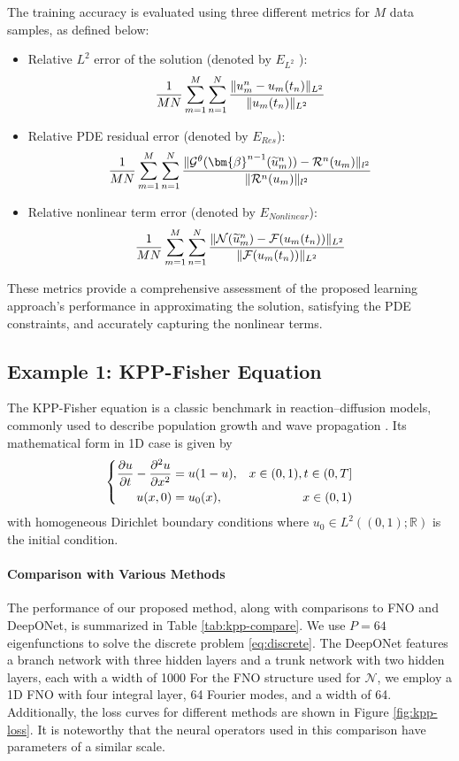 \documentclass[preprint,12pt]{elsarticle}
\theoremstyle{plain}
\numberwithin{figure}{section}
\numberwithin{table}{section}
\begin{document}
The training accuracy is evaluated using three different metrics for $M$ data samples, as defined below:
\begin{itemize}
	\item Relative $L^2$  error of the solution (denoted by $E_{L^2}$ ): 
	$${1\over MN}\sum_{m=1}^M\sum_{n=1}^{N} {\|{u}^n_m-u_m(t_n)\|_{L^2}\over \|u_m(t_n)\|_{L^2}}$$
	\item Relative PDE residual error (denoted by $E_{Res}$):
	$${1\over MN}\sum_{m=1}^M\sum_{n=1}^{N} {\|\mathcal{G}^\theta(\bm{{\beta}}^{n-1}(\widetilde{u}^n_m))-\mathcal{R}^n(u_m)\|_{l^2}\over \|\mathcal{R}^n(u_m)\|_{l^2}}$$
	\item Relative nonlinear term error (denoted by $E_{Nonlinear}$):
	$${1\over MN}\sum_{m=1}^M\sum_{n=1}^{N} {\|\mathcal{N}(\widetilde{u}^n_m)-\mathcal{F}(u_m(t_n))\|_{L^2}\over \|\mathcal{F}(u_m(t_n))\|_{L^2}}$$
\end{itemize}

These metrics provide a comprehensive assessment of the proposed learning approach’s performance in approximating the solution, satisfying the PDE constraints, and accurately capturing the nonlinear terms.
\subsection{Example 1: KPP-Fisher  Equation}\label{subsec:kpp}
The KPP-Fisher equation is a classic benchmark in reaction--diffusion models, commonly used to describe population growth and wave propagation \cite{holmes1994partial,fisher1937wave}. Its mathematical form in 1D case is given by\begin{equation}
	\left\{	\begin{aligned}
		{\partial u\over \partial t}-{\partial^2 u\over \partial x^2}  &= u(1 -u),  &x\in (0,1),t\in (0,T]\\
		u(x,0) &= u_0(x), &x\in (0,1)
	\end{aligned}\right.
\end{equation}
with homogeneous Dirichlet boundary conditions where $u_0 \in L^2((0,1);\mathbb{R})$ is the initial condition. 

\paragraph{Comparison with  Various Methods}

The performance of our proposed method, along with comparisons to FNO and DeepONet, is summarized in Table \ref{tab:kpp-compare}. We use $P = 64$ eigenfunctions to solve the discrete problem \eqref{eq:discrete}. The DeepONet features a branch network with three hidden layers and a trunk network with two hidden layers, each with a width of 1000 For the FNO structure used for $\mathcal{N}$, we employ a 1D FNO with four integral layer, 64 Fourier modes, and a width of 64. Additionally, the loss curves for different methods are shown in Figure \ref{fig:kpp-loss}. It is noteworthy that the neural operators used in this comparison have parameters of a similar scale.
\end{document}
